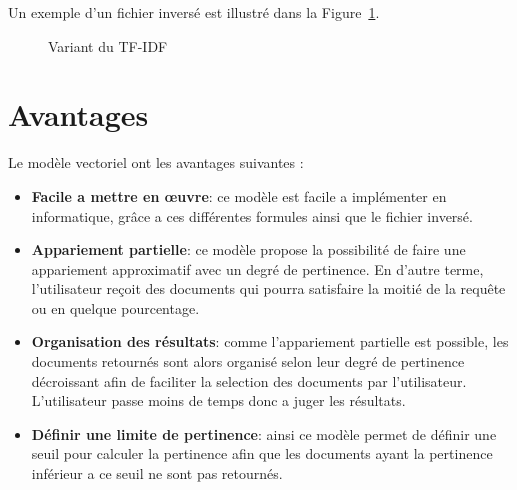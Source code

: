 Un exemple d'un fichier inversé est illustré dans la Figure~\ref{fig:inverted-indexes}.
\begin{figure}[htbp]
	\begin{center}
	\end{center}
	\caption{Variant du TF-IDF \citep{inverted-indexes}}\label{fig:inverted-indexes}
\end{figure}

\section{Avantages}
Le modèle vectoriel ont les avantages suivantes \citep*{approche-semantique, soulier2014:def-evaluation-modele}:
\begin{itemize}
    \item \textbf{Facile a mettre en œuvre}: ce modèle est facile a implémenter en informatique, grâce a ces différentes formules ainsi que le fichier inversé.
    \item \textbf{Appariement partielle}: ce modèle propose la possibilité de faire une appariement approximatif avec un degré de pertinence. En d'autre terme, l'utilisateur reçoit des documents qui pourra satisfaire la moitié de la requête ou en quelque pourcentage.
    \item \textbf{Organisation des résultats}: comme l'appariement partielle est possible, les documents retournés sont alors organisé selon leur degré de pertinence décroissant afin de faciliter la selection des documents par l'utilisateur. L'utilisateur passe moins de temps donc a juger les résultats.
    \item \textbf{Définir une limite de pertinence}: ainsi ce modèle permet de définir une seuil pour calculer la pertinence afin que les documents ayant la pertinence inférieur a ce seuil ne sont pas retournés.
\end{itemize}

